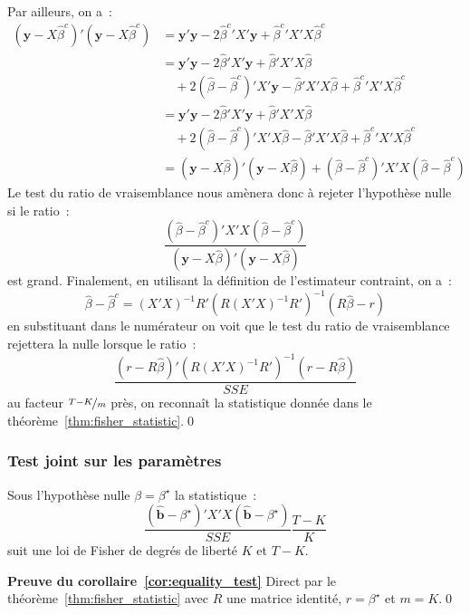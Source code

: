 \documentclass[10pt]{beamer}
\begin{document}
\begin{notes}
  Par ailleurs, on a~:
  \[
    \begin{split}
      \left(\mathbf y - X\hat\beta^c\right)'\left(\mathbf y - X\hat\beta^c\right) &= \mathbf y'\mathbf y - 2\left.\hat\beta^c\right.'X'\mathbf y + \left.\hat\beta^c\right.'X'X \hat\beta^c\\
                                                                                  &= \mathbf y'\mathbf y - 2\hat\beta'X'\mathbf y + \left.\hat\beta\right.'X'X \hat\beta\\ &\quad + 2\left(\hat\beta-\hat\beta^c \right)'X'\mathbf y - \left.\hat\beta\right.'X'X \hat\beta + \left.\hat\beta^c\right.'X'X \hat\beta^c\\
      &= \mathbf y'\mathbf y - 2\hat\beta'X'\mathbf y + \left.\hat\beta\right.'X'X \hat\beta\\ &\quad + 2\left(\hat\beta-\hat\beta^c \right)'X'X\hat\beta - \left.\hat\beta\right.'X'X \hat\beta + \left.\hat\beta^c\right.'X'X \hat\beta^c\\
      &= \left(\mathbf y - X\hat\beta\right)'\left(\mathbf y - X\hat\beta\right) + \left(\hat\beta-\hat\beta^c\right)'X'X\left(\hat\beta-\hat\beta^c\right)
    \end{split}
  \]
  Le test du ratio de vraisemblance nous amènera donc à rejeter l'hypothèse nulle si le ratio~:
  \[
    \frac{\left(\hat\beta-\hat\beta^c\right)'X'X\left(\hat\beta-\hat\beta^c\right)}{\left(\mathbf y - X\hat\beta\right)'\left(\mathbf y - X\hat\beta\right)}
  \]
  est grand. Finalement, en utilisant la définition de l'estimateur contraint, on a~:
  \[
    \hat\beta - \hat\beta^c = (X'X)^{-1}R'\left( R(X'X)^{-1}R' \right)^{-1}\left( R\hat{\beta}-r \right)
  \]
  en substituant dans le numérateur on voit que le test du ratio de vraisemblance rejettera la nulle lorsque le ratio~:
  \[
    \frac{\left(r-R\hat{\beta}\right)'\left( R(X'X)^{-1}R' \right)^{-1}\left(r-R\hat{\beta}\right)}{SSE}
  \]
  au facteur $\nicefrac{T-K}{m}$ près, on reconnaît la statistique donnée dans le théorème~\ref{thm:fisher_statistic}.\qed

\end{notes}


\begin{frame}
  \frametitle{Test joint sur les paramètres}

  \begin{cor}\label{cor:equality_test}
    Sous l'hypothèse nulle $\beta = \beta^{\star}$ la statistique~:
    \[
      \frac{\left(\hat{\mathbf b}-\beta^{\star}\right)'X'X\left(\hat{\mathbf b}-\beta^{\star}\right)}{SSE}\frac{T-K}{K}
    \]
    suit une loi de Fisher de degrés de liberté $K$ et $T-K$.
  \end{cor}

  \bigskip\bigskip

  \textbf{Preuve du corollaire~\ref{cor:equality_test}} Direct par le théorème~\ref{thm:fisher_statistic} avec $R$ une matrice identité, $r=\beta^{\star}$ et $m=K$.\qed

\end{frame}
\end{document}
